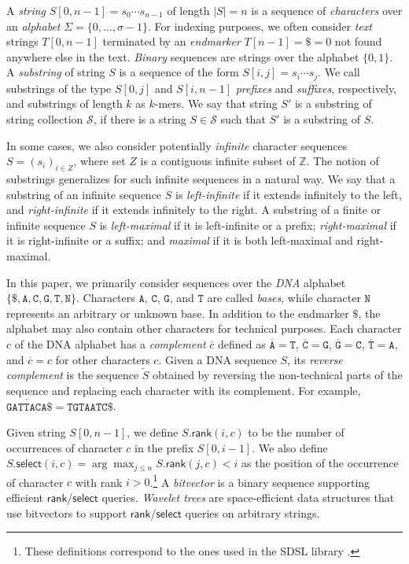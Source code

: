 \documentclass[a4paper,UKenglish]{lipics-v2016}
\newcommand{\set}[1]{\ensuremath{\{ #1 \}}}
\newcommand{\abs}[1]{\ensuremath{\lvert #1 \rvert}}
\newcommand{\dnaseq}[1]{\ensuremath{\mathtt{#1}}}
\newcommand{\baseA}{\dnaseq{A}}
\newcommand{\baseC}{\dnaseq{C}}
\newcommand{\baseG}{\dnaseq{G}}
\newcommand{\baseT}{\dnaseq{T}}
\newcommand{\baseN}{\dnaseq{N}}
\newcommand{\dnacomp}[1]{\ensuremath{\overline{#1}}}
\newcommand{\revcomp}[1]{\ensuremath{\overleftarrow{#1}}}
\newcommand{\rank}{\ensuremath{\mathsf{rank}}}
\newcommand{\select}{\ensuremath{\mathsf{select}}}
\newcommand{\kmer}[1]{$#1$\nobreakdash-mer}
\begin{document}
A \emph{string} $S[0, n-1] = s_{0} \dotsm s_{n-1}$ of length $\abs{S} = n$ is a sequence of \emph{characters} over an \emph{alphabet} $\Sigma = \set{0, \dotsc, \sigma - 1}$. For indexing purposes, we often consider \emph{text} strings $T[0, n-1]$ terminated by an \emph{endmarker} $T[n-1] = \$ = 0$ not found anywhere else in the text. \emph{Binary} sequences are strings over the alphabet $\set{0, 1}$. A \emph{substring} of string $S$ is a sequence of the form $S[i, j] = s_{i} \dotsm s_{j}$. We call substrings of the type $S[0, j]$ and $S[i, n-1]$ \emph{prefixes} and \emph{suffixes}, respectively, and substrings of length $k$ as \kmer{k}s. We say that string $S'$ is a substring of string collection $\mathcal{S}$, if there is a string $S \in \mathcal{S}$ such that $S'$ is a substring of $S$.

In some cases, we also consider potentially \emph{infinite} character sequences $S = (s_{i})_{i \in Z}$, where set $Z$ is a contiguous infinite subset of $\mathbb{Z}$. The notion of substrings generalizes for such infinite sequences in a natural way. We say that a substring of an infinite sequence $S$ is \emph{left-infinite} if it extends infinitely to the left, and \emph{right-infinite} if it extends infinitely to the right. A substring of a finite or infinite sequence $S$ is \emph{left-maximal} if it is left-infinite or a prefix; \emph{right-maximal} if it is right-infinite or a suffix; and \emph{maximal} if it is both left-maximal and right-maximal.

In this paper, we primarily consider sequences over the \emph{DNA} alphabet $\set{\$, \baseA, \baseC, \baseG, \baseT, \baseN}$. Characters $\baseA$, $\baseC$, $\baseG$, and $\baseT$ are called \emph{bases}, while character $\baseN$ represents an arbitrary or unknown base. In addition to the endmarker $\$$, the alphabet may also contain other characters for technical purposes. Each character $c$ of the DNA alphabet has a \emph{complement} $\dnacomp{c}$ defined as $\dnacomp{\baseA} = \baseT$, $\dnacomp{\baseC} = \baseG$, $\dnacomp{\baseG} = \baseC$, $\dnacomp{\baseT} = \baseA$, and $\dnacomp{c} = c$ for other characters $c$. Given a DNA sequence $S$, its \emph{reverse complement} is the sequence $\revcomp{S}$ obtained by reversing the non-technical parts of the sequence and replacing each character with its complement. For example, $\revcomp{\dnaseq{GATTACA}\$} = \dnaseq{TGTAATC}\$$.

Given string $S[0, n-1]$, we define $S.\rank(i, c)$ to be the number of occurrences of character $c$ in the prefix $S[0, i-1]$. We also define $S.\select(i, c) = \arg \max_{j \le n} S.\rank(j, c) < i$ as the position of the occurrence of character $c$ with rank $i > 0$.\footnote{These definitions correspond to the ones used in the SDSL library \cite{Gog2014b}.} A \emph{bitvector} is a binary sequence supporting efficient $\rank$/$\select$ queries. \emph{Wavelet trees} \cite{Grossi2003} are space-efficient data structures that use bitvectors to support $\rank$/$\select$ queries on arbitrary strings.
\end{document}
